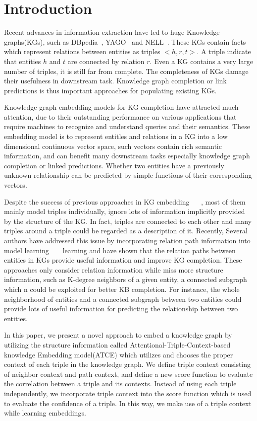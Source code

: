 \section{Introduction}
Recent advances in information extraction have led to huge Knowledge graphs(KGs), such as DBpedia~\cite{DBpedia2007}, YAGO~\cite{Yago2007} and NELL~\cite{NELL2015}. These KGs contain facts which represent relations between entities as triples $<h,r,t>$. A triple indicate that entities $h$ and $t$ are connected by relation $r$. Even a KG contains a very large number of triples, it is still far from complete. The completeness of KGs damage their usefulness in downstream task. Knowledge graph completion or link predictions is thus important approaches for populating existing KGs.

Knowledge graph embedding models for KG completion have attracted much attention, due to their outstanding performance on various applications that require machines to recognize and understand queries and their semantics. These embedding model is to represent entitles and relations in a KG into a low dimensional continuous vector space, such vectors contain rich semantic information, and can benefit many downstream tasks especially knowledge graph completion or linked predictions.  Whether two entities have a previously unknown relationship can be predicted by simple functions of their corresponding vectors.

Despite the success of previous approaches in KG embedding ~\cite{BordesUGWY13} ~\cite{WangZFC14}, most of them mainly model triples individually, ignore lots of information implicitly provided by the structure of the KG. In fact, triples are connected to each other and many triples around a triple could be regarded as a description of it. Recently, Several authors have addressed this issue by incorporating relation path information into model learning ~\cite{LinLLSRL15} ~\cite{Toutanova16} learning and have shown that the relation paths between entities in KGs provide useful information and improve KG completion. These approaches only consider relation information while miss more structure information, such as K-degree neighbors of a given entity, a connected subgraph which n could be exploited for better KB completion. For instance, the whole neighborhood of entities and a connected subgraph between two entities could provide lots of useful information for predicting the relationship between two entities.

In this paper, we present a novel approach to embed a knowledge graph by utilizing the structure information called Attentional-Triple-Context-based knowledge Embedding model(ATCE) which utilizes and chooses the proper context of each triple in the knowledge graph. We define triple context consisting of neighbor context and path context, and define a new score function to evaluate the correlation between a triple and its contexts. Instead of using each triple independently, we incorporate triple context into the score function which is used to evaluate the confidence of a triple. In this way, we make use of a triple context while learning embeddings.

